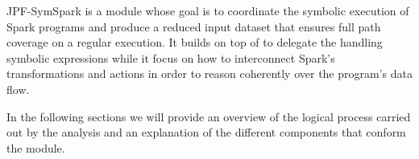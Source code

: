 \label{ch:jpf-symspark}

JPF-SymSpark is a \jpf module whose goal is to coordinate the symbolic execution of Spark programs and produce a reduced input dataset that ensures full path coverage on a regular execution. It builds on top of \spf to delegate the handling symbolic expressions while it focus on how to interconnect Spark's transformations and actions in order to reason coherently over the program's data flow.

In the following sections we will provide an overview of the logical process carried out by the analysis and an explanation of the different components that conform the module.




